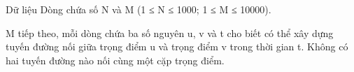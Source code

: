 Dữ liệu
Dòng chứa số N và M (1 ≤ N ≤ 1000; 1 ≤ M ≤ 10000).  

   M tiếp theo, mỗi dòng chứa ba số nguyên u, v và t cho biết có thể xây dựng tuyến đường nối giữa trọng điểm u và trọng điểm v trong thời gian t. Không có hai tuyến đường nào nối cùng một cặp trọng điểm.